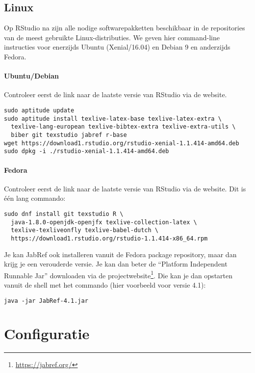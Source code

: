 \subsection{Linux}

Op RStudio na zijn alle nodige softwarepakketten beschikbaar in de repositories van de meest gebruikte Linux-distributies. We geven hier command-line instructies voor enerzijds Ubuntu (Xenial/16.04) en Debian 9 en anderzijds Fedora.

\paragraph{Ubuntu/Debian} 

Controleer eerst de link naar de laatste versie van RStudio via de website.

\begin{verbatim}
sudo aptitude update
sudo aptitude install texlive-latex-base texlive-latex-extra \
  texlive-lang-european texlive-bibtex-extra texlive-extra-utils \
  biber git texstudio jabref r-base
wget https://download1.rstudio.org/rstudio-xenial-1.1.414-amd64.deb
sudo dpkg -i ./rstudio-xenial-1.1.414-amd64.deb
\end{verbatim}

\paragraph{Fedora}

Controleer eerst de link naar de laatste versie van RStudio via de website. Dit is één lang commando:

\begin{verbatim}
sudo dnf install git texstudio R \
  java-1.8.0-openjdk-openjfx texlive-collection-latex \
  texlive-texliveonfly texlive-babel-dutch \
  https://download1.rstudio.org/rstudio-1.1.414-x86_64.rpm
\end{verbatim}

Je kan JabRef ook installeren vanuit de Fedora package repository, maar dan krijg je een verouderde versie. Je kan dan beter de ``Platform Independent Runnable Jar'' downloaden via de projectwebsite\footnote{\url{https://jabref.org/}}. Die kan je dan opstarten vanuit de shell met het commando (hier voorbeeld voor versie 4.1):

\begin{verbatim}
java -jar JabRef-4.1.jar
\end{verbatim}

\section{Configuratie}


